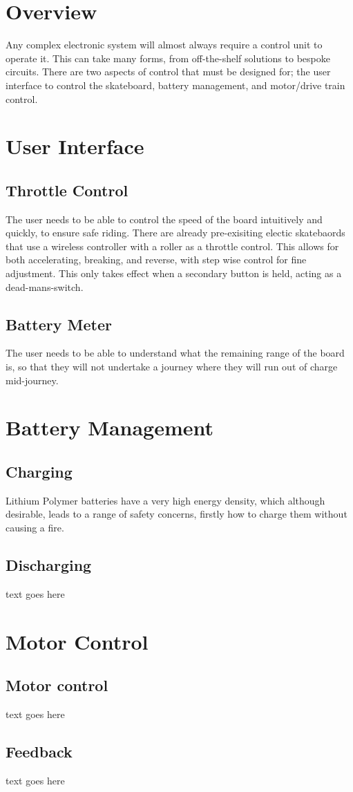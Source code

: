 \documentclass{article}
\begin{document}
\section{Overview}
Any complex electronic system will almost always require a control unit to operate it. This can take many forms, from off-the-shelf solutions to bespoke circuits. There are two aspects of control that must be designed for; the user interface to control the skateboard, battery management, and motor/drive train control.
\section{User Interface}
\subsection{Throttle Control}
The user needs to be able to control the speed of the board intuitively and quickly, to ensure safe riding.
There are already pre-exisiting electic skatebaords that use a wireless controller with a roller as a throttle control. 
This allows for both accelerating, breaking, and reverse, with step wise control for fine adjustment.
This only takes effect when a secondary button is held, acting as a dead-mans-switch.
\subsection{Battery Meter}
The user needs to be able to understand what the remaining range of the board is, so that they will not undertake a journey where they will run out of charge mid-journey.
\section{Battery Management}
\subsection{Charging}
Lithium Polymer batteries have a very high energy density, which although desirable, leads to a range of safety concerns, firstly how to charge them without causing a fire.
\subsection{Discharging}
text goes here
\section{Motor Control}
\subsection{Motor control}
text goes here
\subsection{Feedback}
text goes here
\end{document}
